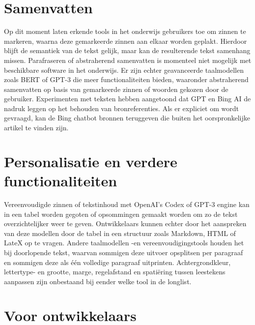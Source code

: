 \section{Samenvatten}

Op dit moment laten erkende tools in het onderwijs gebruikers toe om zinnen te markeren, waarna deze gemarkeerde zinnen aan elkaar worden geplakt. Hierdoor blijft de semantiek van de tekst gelijk, maar kan de resulterende tekst samenhang missen. Parafraseren of abstraherend samenvatten is momenteel niet mogelijk met beschikbare software in het onderwijs. Er zijn echter geavanceerde taalmodellen zoals BERT of GPT-3 die meer functionaliteiten bieden, waaronder abstraherend samenvatten op basis van gemarkeerde zinnen of woorden gekozen door de gebruiker. Experimenten met teksten hebben aangetoond dat GPT en Bing AI de nadruk leggen op het behouden van bronreferenties. Als er expliciet om wordt gevraagd, kan de Bing chatbot bronnen teruggeven die buiten het oorspronkelijke artikel te vinden zijn.

\section{Personalisatie en verdere functionaliteiten}

Vereenvoudigde zinnen of tekstinhoud met OpenAI's Codex of GPT-3 engine kan in een tabel worden gegoten of opsommingen gemaakt worden om zo de tekst overzichtelijker weer te geven. Ontwikkelaars kunnen echter door het aanspreken van deze modellen door de tabel in een structuur zoals Markdown, HTML of LateX op te vragen. Andere taalmodellen -en vereenvoudigingstools houden het bij doorlopende tekst, waarvan sommigen deze uitvoer opsplitsen per paragraaf en sommigen deze als één volledige paragraaf uitprinten. Achtergrondkleur, lettertype- en grootte, marge, regelafstand en spatiëring tussen leestekens aanpassen zijn onbestaand bij eender welke tool in de longlist.

\section{Voor ontwikkelaars}

